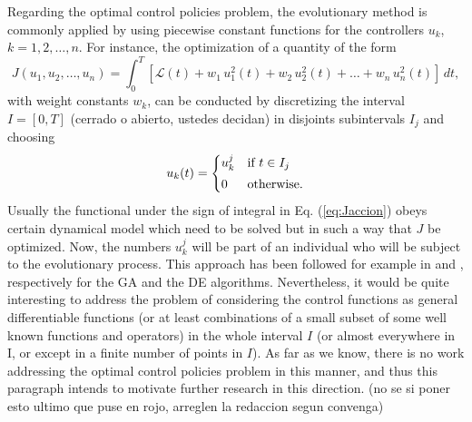 Regarding the optimal control policies problem, the evolutionary 
method is commonly applied by using piecewise constant functions for the 
controllers $u_k$, $k=1,2,\dots,n$. For instance, the optimization of a
quantity of the form
\begin{equation}
J(u_1,u_2,\dots,u_n) = \int_0^T{\left[ \mathcal{L}(t) + w_1\,u_1^2(t) + 
w_2\,u_2^2(t)+\dots + w_n\,u_n^2(t) \right]\,dt},
\label{eq:Jaccion}
\end{equation}
with weight constants $w_k$, can be conducted by discretizing the 
interval $I = [0,T]$ {\color{red}(cerrado o abierto, ustedes decidan)} in disjoints subintervals $I_j$ and choosing  
\begin{equation}\label{DECrossover}
u_{k}(t) =
\begin{cases}
u^j_{k} & \text{if $t \in I_j$}
\vspace*{0.1cm}\\
0 & \text{otherwise.}
\end{cases}
\end{equation}
Usually the functional under the sign of integral in Eq. (\ref{eq:Jaccion})
obeys certain dynamical model which need to be solved but in such a way
that $J$ be optimized. Now, the numbers $u^j_{k}$ will be part of an 
individual who will be subject to the evolutionary process. This approach 
has been followed for example in \cite{Yan2008} and \cite{Jang2018}, 
respectively for the GA and the DE algorithms. {\color{red} Nevertheless,
it would be quite
interesting to address the problem of considering the control functions 
as  general differentiable functions (or at least combinations of a 
small subset of some well known functions and operators) in the whole 
interval $I$ (or almost everywhere in I, or except in a finite number of 
points in $I$). As far as we know, there is no work addressing the optimal control policies problem in this manner, and thus this paragraph intends to motivate further research in this direction.} (no se si poner esto ultimo que puse en rojo, arreglen la redaccion segun convenga)

